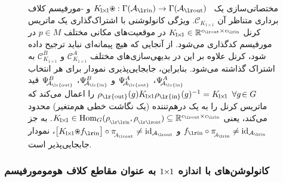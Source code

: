 \begin{figure}
\begin{tikzcd}
    \end{tikzcd}
    \caption{\small
        مختصاتی‌سازی یک 
        \onexoneGMfarsi\ $K_{\!1\!\times\!1} \protect\ostar: \Gamma(\Ain) \to \Gamma(\Aout)$ و -مورفیسم کلاف برداری متناظر آن $\mathcal{C}_{K_{\!1\!\times\!1}}$.
        ویژگی کانولوشنی با اشتراک‌گذاری یک ماتریس کرنل $K_{\!1\!\times\!1}\in\R^{\cout\times\cin}$ در موقعیت‌های مکانی مختلف $p\in M$ در مورفیسم کدگذاری می‌شود.
        از آنجایی که هیچ پیمانه‌ای نباید ترجیح داده شود، کرنل علاوه بر این در بدیهی‌سازی‌های مختلف
        $\mathcal{C}_{K_{\!1\!\times\!1}}^A$ و $\mathcal{C}_{K_{\!1\!\times\!1}}^B$ به اشتراک گذاشته می‌شود.
        بنابراین، جابجایی‌پذیری نمودار برای هر انتخاب
        $\Psi_{\!\!\A_\text{\lr{in}} }^A$،
        $\Psi_{\!\!\A_\text{\lr{out}}}^A$ و
        $\Psi_{\!\!\A_\text{\lr{in}} }^B$،
        $\Psi_{\!\!\A_\text{\lr{out}}}^B$
        قید
        $\rho_\text{\lr{out}}(g) K_{\!1\!\times\!1} \rho_\text{\lr{in}}(g)^{-1} = K_{\!1\!\times\!1}\,\ \forall g\!\in G$
        را اعمال می‌کند که ماتریس کرنل را به یک درهم‌تننده (یک نگاشت خطی هم‌متغیر) محدود می‌کند، یعنی
        $K_{\!1\!\times\!1} \in \Hom_G(\rhoin,\rhoout) \subseteq \R^{\cout\times\cin}$.
        به جز $\fin \circ \piAin \neq \id_{\Ain}$ و $\big[K_{\!1\!\times\!1} \protect\ostar \fin\big] \circ \piAout \neq \id_{\Aout}$، نمودار جابجایی‌پذیر است.
    }
    \label{fig:triv_bundle_morphism_onexone}
\end{figure}










\subsubsection[\texorpdfstring{کانولوشن‌های \lr{GM} با اندازه ${1\kern-2.7pt\times\kern-2.9pt1}$}{1x1} به عنوان مقاطع کلاف هومومورفیسم]%
          {کانولوشن‌های  با اندازه \texorpdfstring{${1\kern-2.7pt\times\kern-2.9pt1}$}{1x1} به عنوان مقاطع کلاف هومومورفیسم}
\label{sec:onexone_hom_section}


